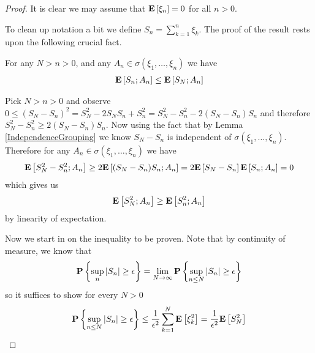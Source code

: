 \begin{proof}
It is clear we may assume that $\textbf{E}\left[\xi_n\right] = 0$ for all $n >
0$.  

To clean up notation a bit we define $S_n = \sum_{k=1}^n    \xi_k$.
The proof of the result rests upon the following crucial fact.
\begin{clm} For any $N > n >0$, and any $A_n \in \sigma(\xi_1, \dotsc,
  \xi_n)$ we have
\begin{align*}
\textbf{E}\left[S_n ; A_n\right] \leq \textbf{E}\left[S_N ; A_n\right]
\end{align*}
\end{clm}
Pick $N > n > 0$ and observe $0 \leq (S_N-S_n)^2 =  S_N^2 - 2 S_N S_n + S_n^2
= S_N^2 - S_n^2 - 2(S_N - S_n)S_n$ and therefore 
$S_N^2 - S_n^2 \geq 2(S_N - S_n)S_n$.  Now using the fact that by Lemma
\ref{IndependenceGrouping} we know $S_N - S_n$ is independent of
$\sigma(\xi_1, \dotsc, \xi_n)$.  Therefore for any $A_n \in \sigma(\xi_1, \dotsc, \xi_n)$ we have
\begin{align*}
\textbf{E}\left[S_N^2 - S_n^2 ; A_n\right] \geq 2\textbf{E}\left[(S_N - S_n)S_n;
  A_n\right] = 2\textbf{E}\left[S_N - S_n\right]\textbf{E}\left[S_n;  A_n\right] = 0
\end{align*}
which gives us 
\begin{align*}
\textbf{E}\left[S_N^2; A_n\right] \geq \textbf{E}\left[S_n^2;  A_n\right] 
\end{align*}
by linearity of expectation.  

Now we start in on the inequality to be proven.  Note that by continuity of measure, we know that 
\begin{align*}
\textbf{P}\left \{\sup_n \left \vert S_n \right \vert  \geq \epsilon \right \}  =
\lim_{N \to \infty} \textbf{P}\left \{\sup_{n \leq N} \left \vert S_n \right \vert  \geq \epsilon \right \}
\end{align*}
so it suffices to show for every $N > 0$ 
\begin{align*}
\textbf{P}\left \{\sup_{n \leq N} \left \vert S_n \right \vert \geq \epsilon \right \} \leq
\frac{1}{\epsilon^2} \sum_{k=1}^N \textbf{E}\left[\xi_k^2\right] =
\frac{1}{\epsilon^2} \textbf{E}\left[S_N^2\right]
\end{align*}


\end{proof}
